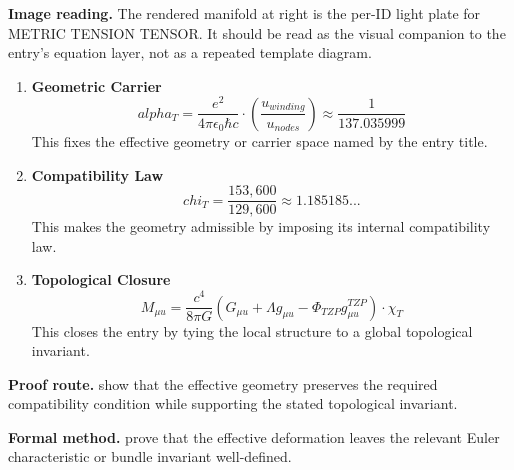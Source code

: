 \begin{samepage}
\noindent\begin{minipage}[t]{0.45\linewidth}
\vspace{0pt}
\raggedright
\scriptsize\textbf{Image reading.} The rendered manifold at right is the per-ID light plate for METRIC TENSION TENSOR. It should be read as the visual companion to the entry's equation layer, not as a repeated template diagram.\par
\end{minipage}\hfill
\begin{minipage}[t]{0.53\linewidth}
\vspace*{-0.10in}
\raggedright
{}
\end{minipage}
\end{samepage}

\clearpage


\begin{enumerate}[leftmargin=1.6em,itemsep=9pt,topsep=6pt]
\item \textbf{Geometric Carrier}
\[
alpha_T = \frac{e^2}{4\pi\epsilon_0 \hbar c} \cdot \left( \frac{ u_{winding}}{ u_{nodes}} \right) \approx \frac{1}{137.035999}
\]
This fixes the effective geometry or carrier space named by the entry title.

\item \textbf{Compatibility Law}
\[
chi_T = \frac{153,600}{129,600} \approx 1.185185...
\]
This makes the geometry admissible by imposing its internal compatibility law.

\item \textbf{Topological Closure}
\[
M_{\mu u} = \frac{c^4}{8\pi G} (G_{\mu u} + \Lambda g_{\mu u} - \Phi_{TZP} g^{TZP}_{\mu u}) \cdot \chi_T
\]
This closes the entry by tying the local structure to a global topological invariant.
\end{enumerate}

\textbf{Proof route.} show that the effective geometry preserves the required compatibility condition while supporting the stated topological invariant.

\textbf{Formal method.} prove that the effective deformation leaves the relevant Euler characteristic or bundle invariant well-defined.

\medskip
{}

